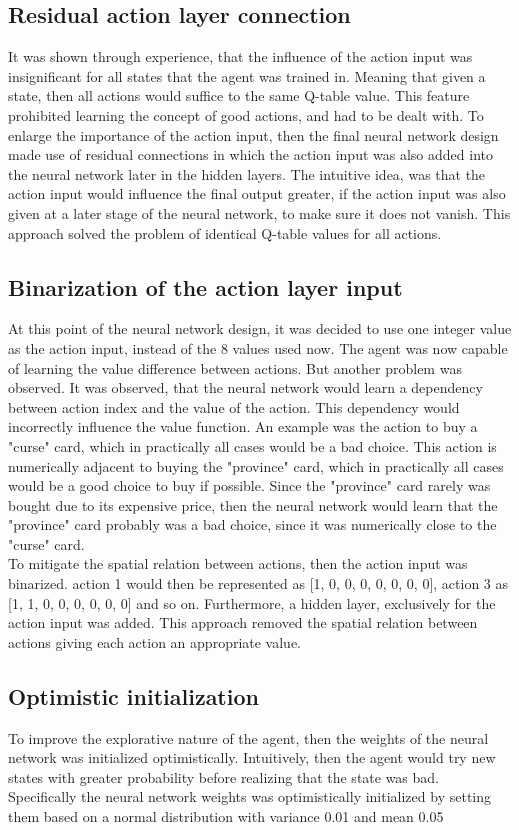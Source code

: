 \subsection{Residual action layer connection}
It was shown through experience, that the influence of the action input was insignificant for all states that the agent was trained in. Meaning that given a state, then all actions would suffice to the same Q-table value. This feature prohibited learning the concept of good actions, and had to be dealt with. To enlarge the importance of the action input, then the final neural network design made use of residual connections in which the action input was also added into the neural network later in the hidden layers. The intuitive idea, was that the action input would influence the final output greater, if the action input was also given at a later stage of the neural network, to make sure it does not vanish. This approach solved the problem of identical Q-table values for all actions. 

\subsection{Binarization of the action layer input}
At this point of the neural network design, it was decided to use one integer value as the action input, instead of the 8 values used now. The agent was now capable of learning the value difference between actions. But another problem was observed. It was observed, that the neural network would learn a dependency between action index and the value of the action. This dependency would incorrectly influence the value function. An example was the action to buy a "curse" card, which in practically all cases would be a bad choice. This action is numerically adjacent to buying the "province" card, which in practically all cases would be a good choice to buy if possible. Since the "province" card rarely was bought due to its expensive price, then the neural network would learn that the "province" card probably was a bad choice, since it was numerically close to the "curse" card.\\

To mitigate the spatial relation between actions, then the action input was binarized. action 1 would then be represented as [1, 0, 0, 0, 0, 0, 0, 0], action 3 as [1, 1, 0, 0, 0, 0, 0, 0] and so on. Furthermore, a hidden layer, exclusively for the action input was added.
This approach removed the spatial relation between actions giving each action an appropriate value. 

\subsection{Optimistic initialization}
To improve the explorative nature of the agent, then the weights of the neural network was initialized optimistically. Intuitively, then the agent would try new states with greater probability before realizing that the state was bad. Specifically the neural network weights was optimistically initialized by setting them based on a normal distribution with variance 0.01 and mean 0.05 